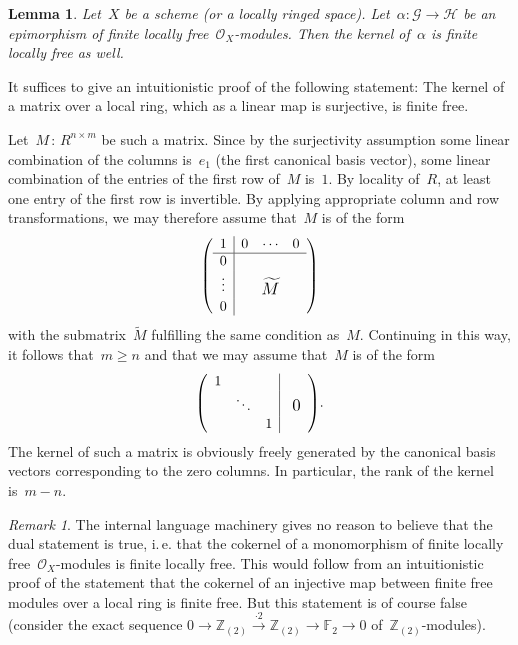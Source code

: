 \documentclass[10pt,reqno,a4paper]{amsbook}
\makeatletter
\theoremstyle{definition}
\theoremstyle{plain}
\newtheorem{lemma}[defn]{Lemma}
\theoremstyle{remark}
\newtheorem{rem}[defn]{Remark}
\newcommand{\ZZ}{\mathbb{Z}}
\newcommand{\FF}{\mathbb{F}}
\renewcommand{\G}{\mathcal{G}}
\renewcommand{\H}{\mathcal{H}}
\renewcommand{\O}{\mathcal{O}}
\newcommand{\?}{\,{:}\,}
\renewcommand{\_}{\mathpunct{.}\,}
\newcommand{\lra}{\longrightarrow}
\newcommand{\ie}{i.\,e.\@\xspace}
\renewenvironment{proof}[1][\proofname]{\par
  \pushQED{\qed}%
  \normalfont \topsep6\p@\@plus6\p@\relax
  \trivlist
  \item[\hskip\labelsep
        \itshape
    #1\@addpunct{.}]\ignorespaces
}{%
  \popQED\endtrivlist\@endpefalse
}
\makeatother
\begin{document}
\begin{lemma}\label{lemma:kernel-of-epi-fingen}
Let~$X$ be a scheme (or a locally ringed space). Let~$\alpha : \G
\to \H$ be an epimorphism of finite locally free~$\O_X$-modules. Then the
kernel of~$\alpha$ is finite locally free as well.\end{lemma}
\begin{proof}It suffices to give an intuitionistic proof of the following
statement: The kernel of a matrix over a local ring, which as a linear map is
surjective, is finite free.

Let~$M \? R^{n \times m}$ be such a matrix. Since by the surjectivity
assumption some linear combination of the columns is~$e_1$ (the first canonical
basis vector), some linear combination of the entries of the first row of~$M$
is~$1$. By locality of~$R$, at least one entry of the first row is invertible.
By applying appropriate column and row transformations, we may therefore assume that~$M$
is of the form
\[ \left(
  \begin{array}{c|ccc}
    1 & 0 & \cdots & 0 \\ \hline
    0 & \multicolumn{3}{c}{\multirow{3}{*}{\raisebox{-5mm}{\scalebox{1.2}{$\widetilde M$}}}} \\
    \raisebox{2pt}{\vdots} & & & \\
    0 & & &
  \end{array}
\right) \]
with the submatrix~$\widetilde M$ fulfilling the same condition as~$M$.
Continuing in this way, it follows that~$m \geq n$ and that we may assume
that~$M$ is of the form
\[ \left(
  \begin{array}{ccc|c}
    1 & & & \multirow{3}{*}{\raisebox{-3mm}{\scalebox{1.2}{\ 0}}} \\
    & \ddots && \\
    && 1
  \end{array}
\right)\!. \]
The kernel of such a matrix is obviously freely generated by the canonical
basis vectors corresponding to the zero columns. In particular, the rank of the
kernel is~$m-n$.
\end{proof}

\begin{rem}The internal language machinery gives no reason to believe that the
dual statement is true, \ie that the cokernel of a monomorphism of finite
locally free~$\O_X$-modules is finite locally free. This would follow from
an intuitionistic proof of the statement that the cokernel of an injective map
between finite free modules over a local ring is finite free. But this
statement is of course false (consider the exact sequence
$0 \lra \ZZ_{(2)} \stackrel{\cdot 2}{\lra} \ZZ_{(2)} \lra \FF_2 \lra 0$
of~$\ZZ_{(2)}$-modules).
\end{rem}
\end{document}
